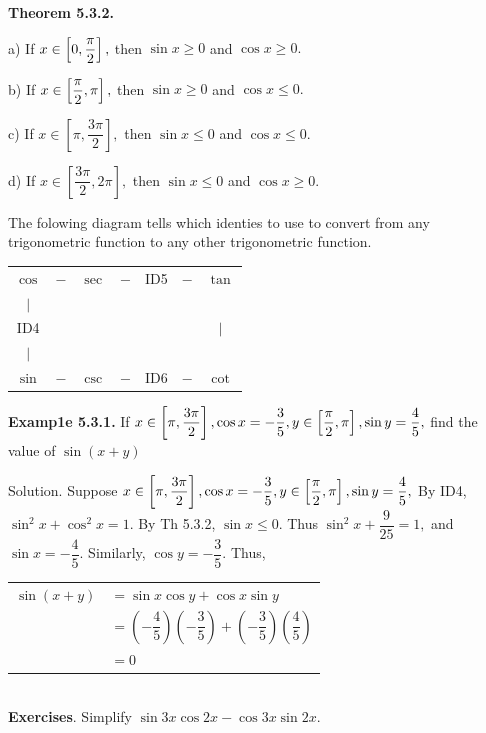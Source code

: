 \textbf{Theorem 5.3.2.}\nl

a) If $x\in \left[0,\dfrac{\pi}{2}\right],$ then $\sin x \geq 0$ and $\cos x \geq 0.$\nl

b) 	If $x\in  \left[\dfrac{\pi}{2},\pi\right],$ then $\sin x \geq 0$ and $\cos x \leq 0.$\nl

c) 	If $x\in  \left[\pi,\dfrac{3\pi}{2}\right],$ then $\sin x \leq 0$ and $\cos x \leq 0.$\nl

d)  If $x\in  \left[\dfrac{3\pi}{2},2\pi\right],$ then $\sin x \leq 0$ and $\cos x \geq 0.$\nl

The folowing diagram tells which identies to use to convert from any trigonometric function to any other trigonometric function.\nl
\begin{center}
\begin{tabular}{c c c c c c c}
$\cos$&$-$&$\sec$&$-$&ID5&$-$&$\tan$\\
$\mid $&&&&&&\\
ID4&&&&&&$\mid$\\
$\mid$&&&&&&\\
$\sin$&$-$&$\text{csc}$&$-$&ID6&$-$&$\text{cot}$\\
\end{tabular}
\end{center}










\textbf{Examp1e 5.3.1.} If $x\in \left[\pi,\dfrac{3\pi}{2}\right] ,\cos x = -\dfrac{3}{5},
y\in  \left[\dfrac{\pi}{2},\pi\right], \sin y = \dfrac{4}{5},$ find the value of $\sin (x + y)$\nl

Solution. Suppose $x\in \left[\pi,\dfrac{3\pi}{2}\right] ,\cos x = -\dfrac{3}{5},
y\in  \left[\dfrac{\pi}{2},\pi\right], \sin y = \dfrac{4}{5},$ By ID4,
$\sin^{2}x + \cos^{2}x = 1.$ By Th 5.3.2, $\sin x \leq 0.$   Thus $\sin^{2}x + \dfrac{9}{25} = 1,$ and $\sin x = -\dfrac{4}{5}.$\nl
Similarly, $\cos y = -\dfrac{3}{5}.$ Thus,

\begin{tabular}{r l}
$\sin (x + y)$&$=\sin x \cos y + \cos x \sin y$\\
&$= \left(-\dfrac{4}{5}\right)\left(-\dfrac{3}{5}\right) + \left(-\dfrac{3}{5}\right)\left(\dfrac{4}{5}\right)$\\
&$= 0$\\
\end{tabular}\\

\textbf{Exercises}. Simplify $\sin 3x \cos 2x - \cos 3x \sin 2x.$\nl

